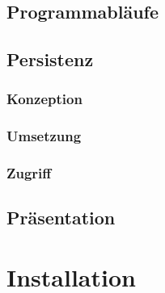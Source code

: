 \documentclass[12pt, oneside, a4paper]{article}		%
\begin{document}
\subsection{Programmabläufe}
\blindtext

\subsection{Persistenz}
\blindtext

\subsubsection{Konzeption}
\blindtext

\subsubsection{Umsetzung}
\blindtext

\subsubsection{Zugriff}
\blindtext

\subsection{Präsentation}
\blindtext

\section{Installation}
\blindtext
\end{document}
